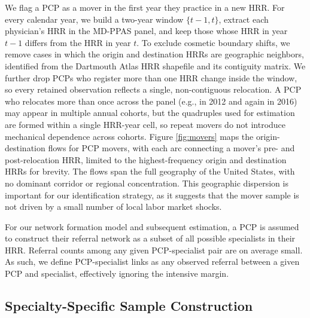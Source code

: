 \documentclass[12pt]{article}
\begin{document}
We flag a PCP as a mover in the first year they practice in a new HRR. For every calendar year, we build a two-year window $\{t-1,t\}$, extract each physician's HRR in the MD-PPAS panel, and keep those whose HRR in year $t-1$ differs from the HRR in year $t$. To exclude cosmetic boundary shifts, we remove cases in which the origin and destination HRRs are geographic neighbors, identified from the Dartmouth Atlas HRR shapefile and its contiguity matrix. We further drop PCPs who register more than one HRR change inside the window, so every retained observation reflects a single, non-contiguous relocation. A PCP who relocates more than once across the panel (e.g., in 2012 and again in 2016) may appear in multiple annual cohorts, but the quadruples used for estimation are formed within a single HRR-year cell, so repeat movers do not introduce mechanical dependence across cohorts. Figure \ref{fig:movers} maps the origin-destination flows for PCP movers, with each arc connecting a mover's pre- and post-relocation HRR, limited to the highest-frequency origin and destination HRRs for brevity. The flows span the full geography of the United States, with no dominant corridor or regional concentration. This geographic dispersion is important for our identification strategy, as it suggests that the mover sample is not driven by a small number of local labor market shocks.

For our network formation model and subsequent estimation, a PCP is assumed to construct their referral network as a subset of all possible specialists in their HRR. Referral counts among any given PCP-specialist pair are on average small. As such, we define PCP-specialist links as any observed referral between a given PCP and specialist, effectively ignoring the intensive margin.

\subsection{Specialty-Specific Sample Construction}
\end{document}
